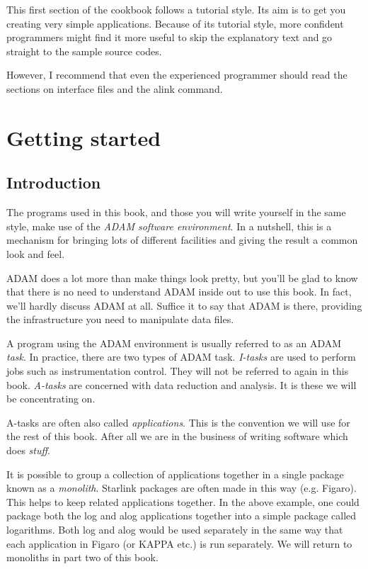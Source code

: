 \documentclass[11pt,nolof]{starlink}
\begin{document}
This first section of the cookbook follows a tutorial style. Its aim is
to get you creating very simple applications. Because of its tutorial
style, more confident programmers might find it more useful to skip the
explanatory text and go straight to the sample source codes.

However, I recommend that even the experienced programmer should read the
sections on \textsf{interface files} and the \textsf{alink} command.

\newpage

\section{Getting started}

\subsection{Introduction}

The programs used in this book, and those you will write yourself in the
same style, make use of the \textit{ADAM software environment}.  In a
nutshell, this is a mechanism for bringing  lots of different
facilities and giving the result a common look and feel.

ADAM does a lot more than make things look pretty, but you'll be glad to
know that there is no need to understand ADAM inside out to use this book.
In fact, we'll hardly discuss ADAM at all. Suffice it to say that ADAM is
there, providing the infrastructure you need to manipulate data files.

       A program using the ADAM environment is usually referred
       to as an ADAM \textit{task}. In practice, there are two types
       of ADAM task. \textit{I-tasks} are used to perform jobs such
       as instrumentation control. They will not be referred to again in
       this book. \textit{A-tasks} are concerned with data reduction and
       analysis. It is these we will be concentrating on.

       A-tasks are often also called \textit{applications}. This is the
       convention we will use for the rest of this book. After all
       we are in the business of writing software which
       does \emph{stuff}.

       It is possible to group a collection of applications together in a
       single package known as a \textit{monolith}. Starlink packages
       are often made in this way (e.g. Figaro). This helps to keep related
       applications together. In the above example, one could package
       both the \textsf{log} and \textsf{alog} applications together
       into a simple package called \textsf{logarithms}. Both \textsf{log} and
       \textsf{alog} would be used separately in the same way that each
       application in \textsf{Figaro} (or \textsf{KAPPA} etc.) is run
       separately. We will return to monoliths in part two of this book.
\end{document}
